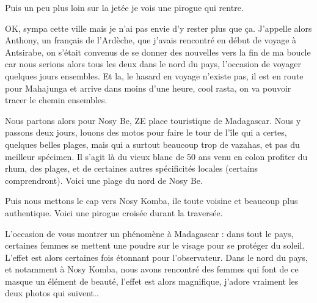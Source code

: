 \begin{multicols}{2}
Puis un peu plus loin sur la jetée je vois une pirogue qui rentre.


OK, sympa cette ville mais je n'ai pas envie d'y rester plus que ça. J'appelle alors Anthony, un français de l'Ardèche, que j'avais rencontré en début de voyage à Antsirabe, on s'était convenus de se donner des nouvelles vers la fin de ma boucle car nous serions alors tous les deux dans le nord du pays, l'occasion de voyager quelques jours ensembles. Et la, le hasard en voyage n'existe pas, il est en route pour Mahajunga et arrive dans moins d'une heure, cool rasta, on va pouvoir tracer le chemin ensembles.

Nous partons alors pour Nosy Be, ZE place touristique de Madagascar. Nous y passons deux jours, louons des motos pour faire le tour de l'île qui a certes, quelques belles plages, mais qui a surtout beaucoup trop de vazahas, et pas du meilleur spécimen. Il s'agit là du vieux blanc de 50 ans venu en colon profiter du rhum, des plages, et de certaines autres spécificités locales (certains comprendront). Voici une plage du nord de Nosy Be.


Puis nous mettons le cap vers Nosy Komba, ile toute voisine et beaucoup plus authentique. Voici une pirogue croisée durant la traversée.


L'occasion de vous montrer un phénomène à Madagascar : dans tout le pays, certaines femmes se mettent une poudre sur le visage pour se protéger du soleil. L'effet est alors certaines fois étonnant pour l'observateur. Dans le nord du pays, et notamment à Nosy Komba, nous avons rencontré des femmes qui font de ce masque un élément de beauté, l'effet est alors magnifique, j'adore vraiment les deux photos qui suivent..




\end{multicols}
